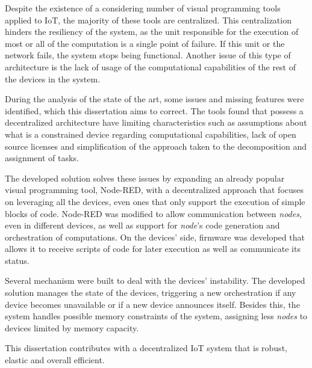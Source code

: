 Despite the existence of a considering number of visual programming tools applied to IoT, the majority of these tools are centralized. This centralization hinders the resiliency of the system, as the unit responsible for the execution of most or all of the computation is a single point of failure. If this unit or the network fails, the system stops being functional. Another issue of this type of architecture is the lack of usage of the computational capabilities of the rest of the devices in the system.

During the analysis of the state of the art, some issues and missing features were identified, which this dissertation aims to correct. The tools found that possess a decentralized architecture have limiting characteristics such as assumptions about what is a constrained device regarding computational capabilities, lack of open source licenses and simplification of the approach taken to the decomposition and assignment of tasks.

The developed solution solves these issues by expanding an already popular visual programming tool, Node-RED, with a decentralized approach that focuses on leveraging all the devices, even ones that only support the execution of simple blocks of code. Node-RED was modified to allow communication between \textit{nodes}, even in different devices, as well as support for \textit{node}'s code generation and orchestration of computations. On the devices' side, firmware was developed that allows it to receive scripts of code for later execution as well as communicate its status. 

Several mechanism were built to deal with the devices' instability. The developed solution manages the state of the devices, triggering a new orchestration if any device becomes unavailable or if a new device announces itself. Besides this, the system handles possible memory constraints of the system, assigning less \textit{nodes} to devices limited by memory capacity.

This dissertation contributes with a decentralized IoT system that is robust, elastic and overall efficient.